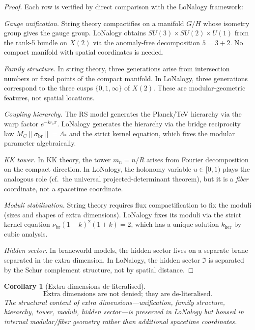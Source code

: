 \documentclass[12pt]{article}
\theoremstyle{plain}
\newtheorem{corollary}[theorem]{Corollary}
\theoremstyle{definition}
\numberwithin{equation}{section}
\newcommand{\br}{\mathrm{br}}
\newcommand{\fI}{\mathfrak{I}}
\begin{document}
\begin{proof}
Each row is verified by direct comparison with the LoNalogy
framework:

\emph{Gauge unification.}
String theory compactifies on a manifold $G/H$ whose isometry group
gives the gauge group.  LoNalogy obtains $SU(3)\times SU(2)\times U(1)$
from the rank-5 bundle on $X(2)$ via the anomaly-free decomposition
$5=3+2$.  No compact manifold with spatial coordinates is needed.

\emph{Family structure.}
In string theory, three generations arise from intersection numbers
or fixed points of the compact manifold.  In LoNalogy, three
generations correspond to the three cusps $\{0,1,\infty\}$ of $X(2)$.
These are modular-geometric features, not spatial locations.

\emph{Coupling hierarchy.}
The RS model generates the Planck/TeV hierarchy via the warp factor
$e^{-k r_c\pi}$.  LoNalogy generates the hierarchy via the bridge
reciprocity law $M_C\|\sigma_{\br}\|=\Lambda_*$ and the strict
kernel equation, which fixes the modular parameter algebraically.

\emph{KK tower.}
In KK theory, the tower $m_n=n/R$ arises from Fourier decomposition
on the compact direction.  In LoNalogy, the holonomy variable
$u\in[0,1)$ plays the analogous role (cf.\ the universal
projected-determinant theorem), but it is a \emph{fiber} coordinate,
not a spacetime coordinate.

\emph{Moduli stabilisation.}
String theory requires flux compactification to fix the moduli
(sizes and shapes of extra dimensions).  LoNalogy fixes its moduli
via the strict kernel equation
$\nu_{\br}(1-k)^2(1+k)=2$, which has a unique solution
$k_{\mathrm{ker}}$ by cubic analysis.

\emph{Hidden sector.}
In braneworld models, the hidden sector lives on a separate brane
separated in the extra dimension.  In LoNalogy, the hidden sector
$\fI$ is separated by the Schur complement structure, not by spatial
distance.
\end{proof}

\begin{corollary}[Extra dimensions de-literalised]
\begin{equation}
\boxed{\text{Extra dimensions are not denied;
they are de-literalised.}}
\end{equation}
The structural content of extra dimensions---unification, family
structure, hierarchy, tower, moduli, hidden sector---is preserved
in LoNalogy but housed in internal modular/fiber geometry rather
than additional spacetime coordinates.
\end{corollary}
\end{document}
